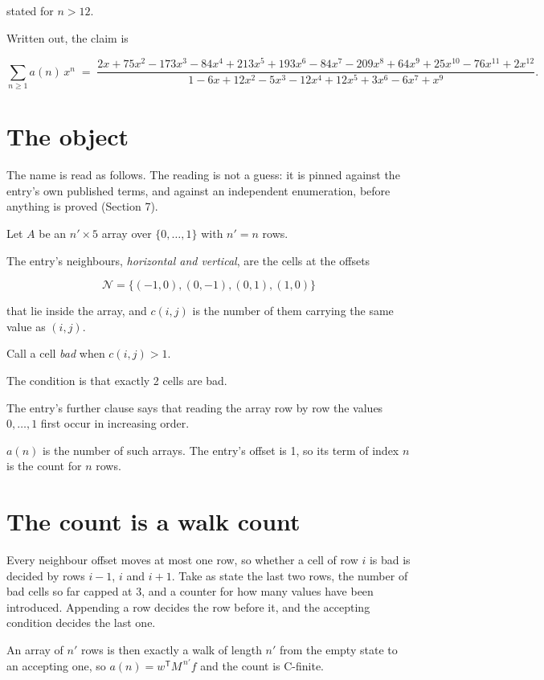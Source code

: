 \documentclass[11pt]{article}
\theoremstyle{definition}
\begin{document}
stated for $n > 12$.

Written out, the claim is

\[\sum_{n \ge 1} a(n)\,x^n \;=\; \frac{2x + 75x^{2} - 173x^{3} - 84x^{4} + 213x^{5} + 193x^{6} - 84x^{7} - 209x^{8} + 64x^{9} + 25x^{10} - 76x^{11} + 2x^{12}}{1 - 6x + 12x^{2} - 5x^{3} - 12x^{4} + 12x^{5} + 3x^{6} - 6x^{7} + x^{9}}.\]

\section{The object}

The name is read as follows. The reading is not a guess: it is pinned against the entry's own published terms, and against an independent enumeration, before anything is proved (Section 7).

Let $A$ be an $n' \times 5$ array over $\{0,\dots,1\}$ with $n' = n$ rows.

The entry's neighbours, {\itshape horizontal and vertical}, are the cells at the offsets

\[\mathcal{N} = \{(-1,0), (0,-1), (0,1), (1,0)\}\]

that lie inside the array, and $c(i,j)$ is the number of them carrying the same value as $(i,j)$.

Call a cell {\itshape bad} when $c(i,j) > 1$.

The condition is that exactly 2 cells are bad.

The entry's further clause says that reading the array row by row the values $0,\dots,1$ first occur in increasing order.

$a(n)$ is the number of such arrays. The entry's offset is 1, so its term of index $n$ is the count for $n$ rows.

\section{The count is a walk count}

Every neighbour offset moves at most one row, so whether a cell of row $i$ is bad is decided by rows $i-1$, $i$ and $i+1$. Take as state the last two rows, the number of bad cells so far capped at 3, and a counter for how many values have been introduced. Appending a row decides the row before it, and the accepting condition decides the last one.

An array of $n'$ rows is then exactly a walk of length $n'$ from the empty state to an accepting one, so $a(n) = w^{\mathsf T}M^{\,n'}f$ and the count is C-finite.
\end{document}
